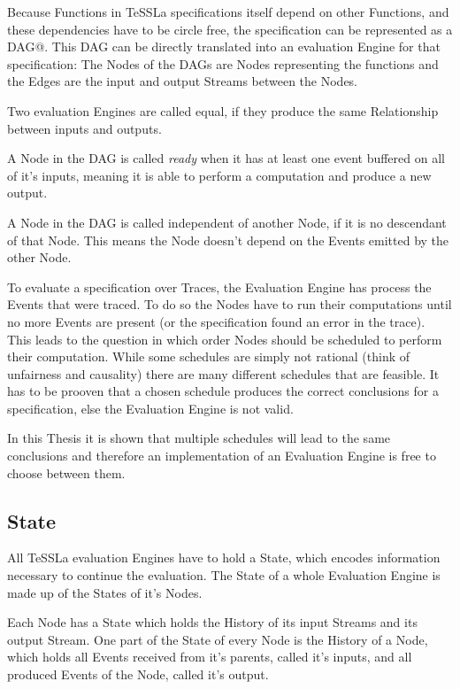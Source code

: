 Because Functions in TeSSLa specifications itself depend on other Functions, and these dependencies have to be circle free,
the specification can be represented as a DAG@.
This DAG can be directly translated into an evaluation Engine for that specification: The Nodes of the DAGs are Nodes representing the functions and the Edges are the input and output Streams between the Nodes.

\begin{definition}
  Two evaluation Engines are called equal, if they produce the same Relationship between inputs and outputs.
\label{def:equality_eval_engine}
\end{definition}

A Node in the DAG is called \emph{ready} when it has at least one event buffered on all of it's inputs, meaning it is able to perform a computation and produce a new output.

A Node in the DAG is called independent of another Node, if it is no descendant of that Node.
This means the Node doesn't depend on the Events emitted by the other Node.

To evaluate a specification over Traces, the Evaluation Engine has process the Events that were traced.
To do so the Nodes have to run their computations until no more Events are present (or the specification found an error in the trace).
This leads to the question in which order Nodes should be scheduled to perform their computation.
While some schedules are simply not rational (think of unfairness and causality) there are many different schedules that are feasible.
It has to be prooven that a chosen schedule produces the correct conclusions for a specification, else the Evaluation Engine is not valid.

In this Thesis it is shown that multiple schedules will lead to the same conclusions and therefore an implementation of an Evaluation Engine is free to choose between them.

\subsection{State}
\label{sec:concepts:def:state}

All TeSSLa evaluation Engines have to hold a State, which encodes information necessary to continue the evaluation.
The State of a whole Evaluation Engine is made up of the States of it's Nodes.

Each Node has a State which holds the History of its input Streams and its output Stream.
One part of the State of every Node is the History of a Node, which holds all Events received from it's parents, called it's inputs, and all produced Events of the Node, called it's output.

